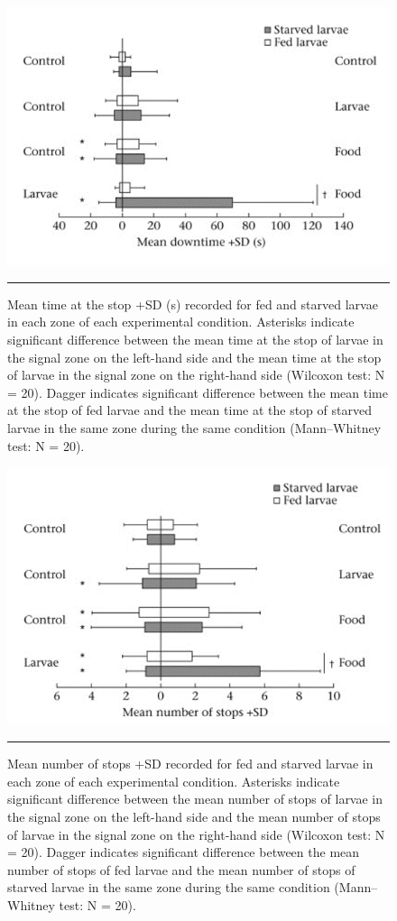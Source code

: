 \begin{figure}[p]
	\centering
    \includegraphics[width=0.85 \textwidth]{Figures/downtime.png}
    \rule{35em}{0.5pt}
    \caption{Mean time at the stop +SD (s) recorded for fed and starved larvae in each zone of each experimental condition. Asterisks indicate significant difference between the mean time at the stop of larvae in the signal zone on the left-hand side and the mean time at the stop of larvae in the signal zone on the right-hand side (Wilcoxon test: N = 20). Dagger indicates significant difference between the mean time at the stop of fed larvae and the mean time at the stop of starved larvae in the same zone during the same condition (Mann–Whitney test: N = 20).}
    \label{fig:downtime}  

	\centering
    \includegraphics[width=0.85 \textwidth]{Figures/stops.png}
    \rule{35em}{0.5pt}
    \caption{Mean number of stops +SD recorded for fed and starved larvae in each zone of each experimental condition. Asterisks indicate significant difference between the mean number of stops of larvae in the signal zone on the left-hand side and the mean number of stops of larvae in the signal zone on the right-hand side (Wilcoxon test: N = 20). Dagger indicates significant difference between the mean number of stops of fed larvae and the mean number of stops of starved larvae in the same zone during the same condition (Mann–Whitney test: N = 20).}
    \label{fig:stops}  
\end{figure}

